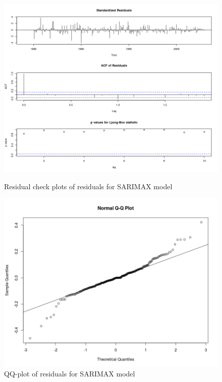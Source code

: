 \documentclass[]{article}
\begin{document}
\begin{figure}[!ht]
\centering
\begin{minipage}{.5\textwidth}
\centering
\includegraphics[width=\linewidth]{tsdiag_sarimax}
\caption{Residual check plots of residuals for SARIMAX model}
\label{tsdiag_sarimax}
\end{minipage}%
\begin{minipage}{.5\textwidth}
\centering
\includegraphics[width=\linewidth]{qq_sarimax}
\caption{QQ-plot of residuals for SARIMAX model}
\label{qq_sarimax}
\end{minipage}
\end{figure}
\end{document}
